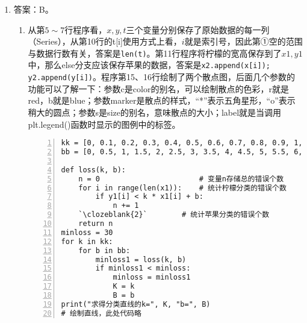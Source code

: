 \begin{enumerate}
\item 答案：B。
	\begin{enumerate}[label=$(\arabic*)$]
\setcounter{qnumber}{1}
\begin{lstlisting}[numbers=left]
import matplotlib.pyplot as plt
import pandas as pd
# 创建画布和坐标系, 此处代码略
df = pd.read_excel("data.xlsx")  # 读取点的坐标值并完成分类存储
x = df["宽度"]
y = df["高度"]
t = df["类别"]
x1 = []; y1 = []; x2 = []; y2 = []
for i in range(`\clozeblank{2}`):
    if t[i] == "柠檬":
        x1.append(x[i]);  y1.append(y[i])
    else:
        `\clozeblank{2}`
# 绘制散点图
plt.scatter(x1, y1, c="r", marker="*", s=15, label="柠檬")
plt.scatter(x2, y2, c="b", marker="o", s=5, label="苹果")
# 显示图例、设置坐标轴后最后显示散点图。此处代码略
\end{lstlisting}
	\item 从第$5 \sim 7$行程序看，$x,y,t$三个变量分别保存了原始数据的每一列（Series），从第10行的t[i]使用方式上看，$i$就是索引号，因此第①空的范围与数据行数有关，答案是\lstinline|len(t)|。第11行程序将柠檬的宽高保存到了$x1,y1$中，那么else分支应该保存苹果的数据，答案是\lstinline|x2.append(x[i]);  y2.append(y[i])|。程序第15、16行绘制了两个散点图，后面几个参数的功能可以了解一下：参数c是color的别名，可以绘制散点的色彩，r就是red，b就是blue；参数marker是散点的样式，“*”表示五角星形，“o”表示稍大的圆点；参数s是size的别名，意味散点的大小；label就是当调用plt.legend()函数时显示的图例中的标签。
\begin{lstlisting}[numbers=left]
kk = [0, 0.1, 0.2, 0.3, 0.4, 0.5, 0.6, 0.7, 0.8, 0.9, 1, 1.1, 1.2, 1.3, 1.4, 1.5, 1.6, 1.7, 1.8, 1.9, 2.0, 3.0, 4.0]
bb = [0, 0.5, 1, 1.5, 2, 2.5, 3, 3.5, 4, 4.5, 5, 5.5, 6, 6.5, 7, 7.5, 8, 8.5, 9, 9.5, 10]

def loss(k, b):    
    n = 0						# 变量n存储总的错误个数
    for i in range(len(x1)):    # 统计柠檬分类的错误个数        
        if y1[i] < k * x1[i] + b:
            n += 1
    `\clozeblank{2}`  		# 统计苹果分类的错误个数
    return n
minloss = 30
for k in kk:
    for b in bb:
        minloss1 = loss(k, b)
        if minloss1 < minloss:
            minloss = minloss1
            K = k
            B = b
print("求得分类直线的k=", K, "b=", B)
# 绘制直线，此处代码略
\end{lstlisting}
\begin{figure}[h!]
\centering
{}
\end{figure}



\end{enumerate}
\end{enumerate}
